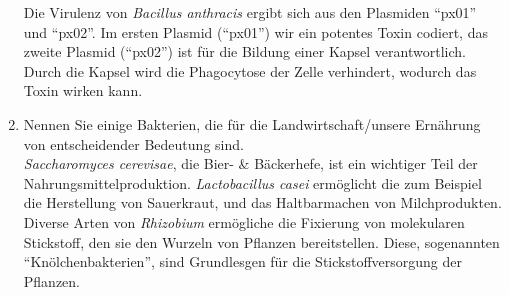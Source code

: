 \begin{enumerate}
		Die Virulenz von \emph{Bacillus anthracis} ergibt sich
		aus den Plasmiden ``px01'' und ``px02''.
		Im ersten Plasmid (``px01'') wir ein potentes Toxin codiert,
		das zweite Plasmid (``px02'') ist für die Bildung einer Kapsel verantwortlich.
		Durch die Kapsel wird die Phagocytose der Zelle verhindert,
		wodurch das Toxin wirken kann.


	\item Nennen Sie einige Bakterien, die für die Landwirtschaft/unsere Ernährung von entscheidender Bedeutung sind. \hfill \\
	
	\emph{Saccharomyces cerevisae}, die Bier- \& Bäckerhefe,
	ist ein wichtiger Teil der Nahrungsmittelproduktion.
	\emph{Lactobacillus casei} ermöglicht die zum Beispiel die Herstellung von Sauerkraut,
	und das Haltbarmachen von Milchprodukten.
	Diverse Arten von \emph{Rhizobium} ermögliche die Fixierung von molekularen Stickstoff,
	den sie den Wurzeln von Pflanzen bereitstellen.
	Diese, sogenannten ``Knölchenbakterien'', sind Grundlesgen für die Stickstoffversorgung der Pflanzen.
\end{enumerate}

